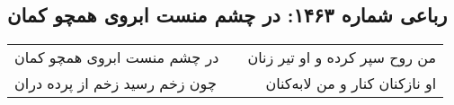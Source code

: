 \begin{center}
\section*{رباعی شماره ۱۴۶۳: در چشم منست ابروی همچو کمان}
\label{sec:1463}
\begin{longtable}{l p{0.5cm} r}
در چشم منست ابروی همچو کمان
&&
من روح سپر کرده و او تیر زنان
\\
چون زخم رسید زخم از پرده دران
&&
او نازکنان کنار و من لابه‌کنان
\\
\end{longtable}
\end{center}
